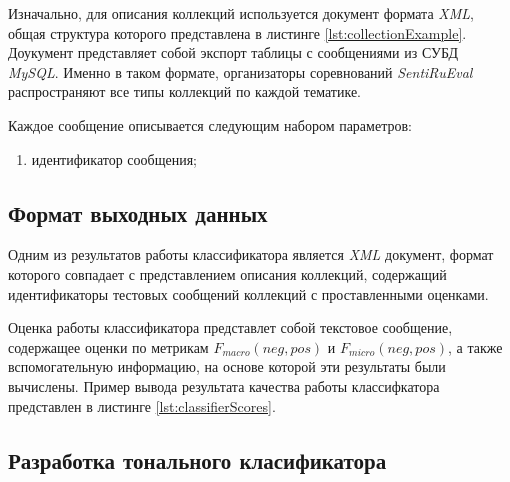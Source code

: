     Изначально, для описания коллекций используется документ формата {\it XML}, общая
    структура которого представлена в листинге \ref{lst:collectionExample}.
    Доукумент представляет собой экспорт таблицы с сообщениями
    из СУБД {\it MySQL}.
    Именно в таком формате, организаторы соревнований {\it SentiRuEval}
    распространяют все типы коллекций по каждой тематике.

    \lstset{style=xml}
    

    Каждое сообщение описывается следующим набором параметров:
    \begin{enumerate}
        \item идентификатор сообщения;
    \end{enumerate}

    \subsection{Формат выходных данных}
    Одним из результатов работы классификатора является {\it XML}
    документ, формат которого совпадает с представлением описания коллекций,
    содержащий идентификаторы тестовых сообщений коллекций с проставленными оценками.


    Оценка работы классификатора представлет собой текстовое сообщение,
    содержащее оценки по метрикам  $F_{macro}(neg, pos)$ и $F_{micro}(neg, pos)$,
    а также вспомогательную информацию, на основе которой эти результаты были
    вычислены. Пример вывода результата качества работы классифкатора представлен
    в листинге \ref{lst:classifierScores}.
    \lstset{style=xml}
    

    \subsection{Разработка тонального класификатора}
